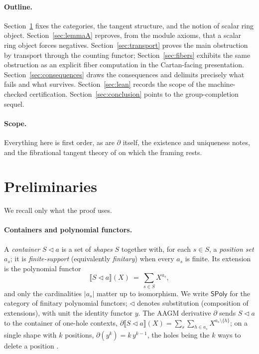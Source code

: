 \documentclass[11pt]{article}
\theoremstyle{definition}
\newcommand{\SPoly}{\mathsf{SPoly}}
\newcommand{\sem}[1]{\llbracket #1 \rrbracket}
\begin{document}
\paragraph{Outline.}
Section~\ref{sec:prelim} fixes the categories, the tangent structure, and the notion of
scalar ring object. Section~\ref{sec:lemmaA} reproves, from the module axioms, that a
scalar ring object forces negatives. Section~\ref{sec:transport} proves the main
obstruction by transport through the counting functor;
Section~\ref{sec:fibers} exhibits the same obstruction as an explicit fiber computation in
the Cartan-facing presentation. Section~\ref{sec:consequences} draws the consequences and
delimits precisely what fails and what survives. Section~\ref{sec:lean} records the scope
of the machine-checked certification. Section~\ref{sec:conclusion} points to the
group-completion sequel.

\paragraph{Scope.}
Everything here is first order, as are $\partial$ itself, the existence and uniqueness
notes, and the fibrational tangent theory of \cite{CCGZ2024} on which the framing rests.

\section{Preliminaries}\label{sec:prelim}

We recall only what the proof uses.

\paragraph{Containers and polynomial functors.}
A \emph{container} $S\lhd a$ is a set of \emph{shapes} $S$ together with, for each $s\in
S$, a \emph{position set} $a_s$; it is \emph{finite-support} (equivalently
\emph{finitary}) when every $a_s$ is finite. Its extension is the polynomial functor
\[
   \sem{S\lhd a}(X)\ =\ \sum_{s\in S} X^{a_s},
\]
and only the cardinalities $|a_s|$ matter up to isomorphism. We write $\SPoly$ for the
category of finitary polynomial functors; $\lhd$ denotes substitution (composition of
extensions), with unit the identity functor $y$. The AAGM derivative $\partial$ sends
$S\lhd a$ to the container of one-hole contexts, $\partial\sem{S\lhd a}(X)=\sum_{s}\sum_{h
\in a_s} X^{a_s\setminus\{h\}}$; on a single shape with $k$ positions,
$\partial(y^k)=k\,y^{k-1}$, the holes being the $k$ ways to delete a position
\cite{AAGM2003}.
\end{document}
